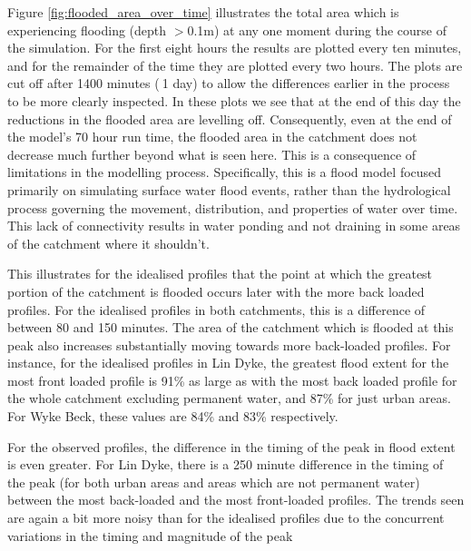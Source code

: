 \documentclass[APA,Times2COL]{WileyNJDv5}
\begin{document}
Figure \ref{fig:flooded_area_over_time} illustrates the total area which is experiencing flooding (depth $>$0.1m) at any one moment during the course of the simulation. For the first eight hours the results are plotted every ten minutes, and for the remainder of the time they are plotted every two hours. The plots are cut off after 1400 minutes ($~$1 day) to allow the differences earlier in the process to be more clearly inspected. In these plots we see that at the end of this day the reductions in the flooded area are levelling off. Consequently, even at the end of the model's 70 hour run time, the flooded area in the catchment does not decrease much further beyond what is seen here. This is a consequence of limitations in the modelling process. Specifically, this is a flood model focused primarily on simulating surface water flood events, rather than the hydrological process governing the movement, distribution, and properties of water over time. This lack of connectivity results in water ponding and not draining in some areas of the catchment where it shouldn't.

This illustrates for the idealised profiles that the point at which the greatest portion of the catchment is flooded occurs later with the more back loaded profiles. For the idealised profiles in both catchments, this is a difference of between 80 and 150 minutes. The area of the catchment which is flooded at this peak also increases substantially moving towards more back-loaded profiles. For instance, for the idealised profiles in Lin Dyke, the greatest flood extent for the most front loaded profile is 91\% as large as with the most back loaded profile for the whole catchment excluding permanent water, and 87\% for just urban areas. For Wyke Beck, these values are 84\% and 83\% respectively. 

For the observed profiles, the difference in the timing of the peak in flood extent is even greater. For Lin Dyke, there is a 250 minute difference in the timing of the peak (for both urban areas and areas which are not permanent water) between the most back-loaded and the most front-loaded profiles. The trends seen are again a bit more noisy than for the idealised profiles due to the concurrent variations in the timing and magnitude of the peak 
\end{document}
